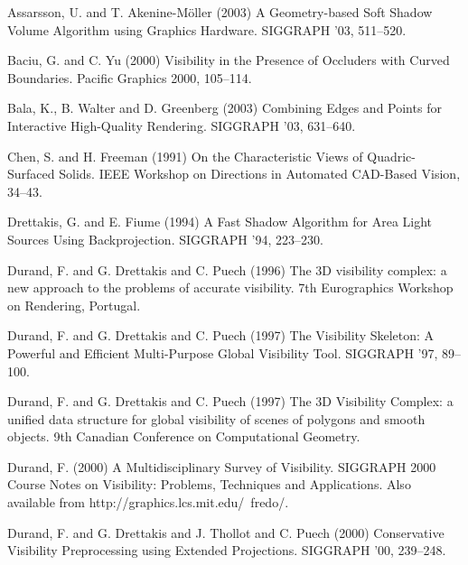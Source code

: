 \documentclass[9pt,twocolumn]{article}
\begin{document}

% 
\begin{thebibliography}{99}

Assarsson, U. and T. Akenine-M\"{o}ller (2003)
A Geometry-based Soft Shadow Volume Algorithm using Graphics Hardware.
SIGGRAPH '03, 511--520.

Baciu, G. and C. Yu (2000)
Visibility in the Presence of Occluders with Curved Boundaries.
Pacific Graphics 2000, 105--114.

Bala, K., B. Walter and D. Greenberg (2003)
Combining Edges and Points for Interactive High-Quality Rendering.
SIGGRAPH '03, 631--640.

Chen, S. and H. Freeman (1991)
On the Characteristic Views of Quadric-Surfaced Solids.
IEEE Workshop on Directions in Automated CAD-Based Vision, 34--43.

Drettakis, G. and E. Fiume (1994)
A Fast Shadow Algorithm for Area Light Sources Using Backprojection.
SIGGRAPH '94, 223--230.

Durand, F. and G. Drettakis and C. Puech (1996)
The 3D visibility complex: a new approach to the problems of accurate
visibility.
7th Eurographics Workshop on Rendering, Portugal.

Durand, F. and G. Drettakis and C. Puech (1997)
The Visibility Skeleton: A Powerful and Efficient Multi-Purpose Global
Visibility Tool.
SIGGRAPH '97, 89--100.

Durand, F. and G. Drettakis and C. Puech (1997)
The 3D Visibility Complex: a unified data structure for global
visibility of scenes of polygons and smooth objects.
9th Canadian Conference on Computational Geometry.


Durand, F. (2000)
A Multidisciplinary Survey of Visibility.
SIGGRAPH 2000 Course Notes on Visibility: Problems, Techniques
and Applications.
Also available from http://graphics.lcs.mit.edu/~fredo/.

Durand, F. and G. Drettakis and J. Thollot and C. Puech (2000)
Conservative Visibility Preprocessing using Extended Projections.
SIGGRAPH '00, 239--248.


\end{thebibliography}
\end{document}
